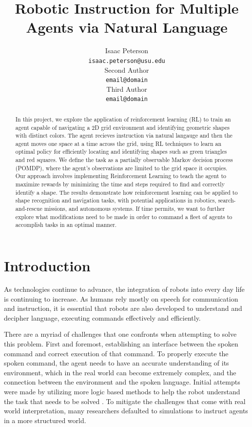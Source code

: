 \documentclass[11pt]{article}
\title{Robotic Instruction for Multiple Agents via Natural Language}
\author{Isaac Peterson \\
  \texttt{isaac.peterson@usu.edu} \\\And
  Second Author \\
  \texttt{email@domain} \\\And 
  Third Author \\
  \texttt{email@domain} 
  }
\begin{document}
\maketitle
\begin{abstract}
  In this project, we explore the application of reinforcement learning (RL) to train an agent capable of navigating a 2D grid environment and identifying geometric shapes with distinct colors. The agent recieves instruction via natural langauge and then the agent moves one space at a time across the grid, using RL techniques to learn an optimal policy for efficiently locating and identifying shapes such as green triangles and red squares. We define the task as a partially observable Markov decision process (POMDP), where the agent's observations are limited to the grid space it occupies. Our approach involves implementing Reinforcement Learning to teach the agent to maximize rewards by minimizing the time and steps required to find and correctly identify a shape. The results demonstrate how reinforcement learning can be applied to shape recognition and navigation tasks, with potential applications in robotics, search-and-rescue missions, and autonomous systems. If time permits, we want to further explore what modifications need to be made in order to command a fleet of agents to accomplish tasks in an optimal manner.

\end{abstract}

\section{Introduction}
As technologies continue to advance, the integration of robots into every day life is continuing to increase. As humans rely mostly on speech for communication and instruction, it is essential that robots are also developed to understand and decipher language, executing commands effectively and efficiently. 

There are a myriad of challenges that one confronts when attempting to solve this problem. First and foremost, establishing an interface between the spoken command and correct execution of that command. To properly execute the spoken command, the agent needs to have an accurate understanding of its environment, which in the real world can become extremely complex, and the connection between the environment and the spoken language. Initial attempts were made by utilizing more logic based methods to help the robot understand the task that needs to be solved \cite{Liu2016}. To mitigate the challenges that come with real world interpretation, many researchers defaulted to simulations to instruct agents in a more structured world.
\end{document}
